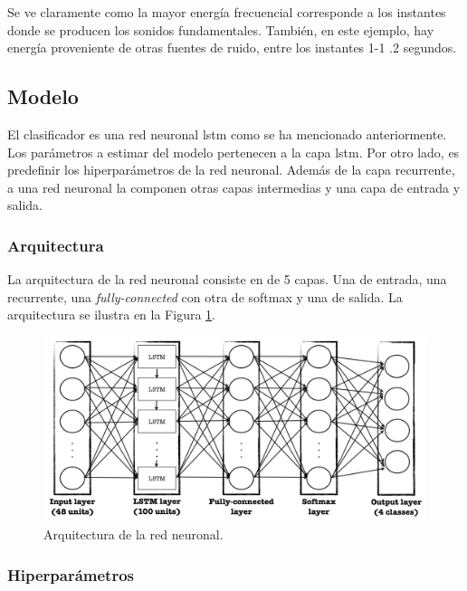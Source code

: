 \indent Se ve claramente como la mayor energía frecuencial corresponde a los instantes donde se producen los sonidos
fundamentales. También, en este ejemplo, hay energía proveniente de otras fuentes de ruido, entre los instantes 1-1
.2 segundos.

\subsection{Modelo} \label{subsec:model}

\indent El clasificador es una red neuronal \acrshort{lstm} como se ha mencionado anteriormente. Los parámetros a
estimar del modelo pertenecen a la capa \acrshort{lstm}. Por otro lado, es predefinir los hiperparámetros de la red
neuronal. Además de la capa recurrente, a una red neuronal la componen otras capas intermedias y una capa de entrada
y salida.

\subsubsection{Arquitectura}

\indent La arquitectura de la red neuronal consiste en de 5 capas. Una de entrada, una recurrente, una
\textit{fully-connected} con otra de softmax y una de salida. La arquitectura se ilustra en la Figura
\ref{fig:nn-architecture}.

\begin{figure}[H]
  \centering
  \includegraphics[scale=0.35]{sections/chapter-07/images/lstm-architecture.png}
  \caption[Arquitectura de la red neuronal]{Arquitectura de la red neuronal.}
  \label{fig:nn-architecture}
\end{figure}

\subsubsection{Hiperparámetros}

